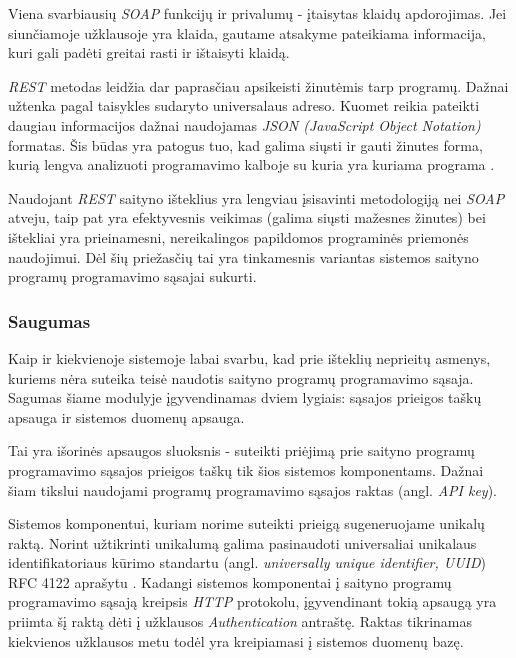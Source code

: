 \documentclass{VUMIFPSkursinis}
\begin{document}
Viena svarbiausių \textit{SOAP} funkcijų ir privalumų - įtaisytas klaidų apdorojimas. Jei siunčiamoje užklausoje yra klaida, gautame atsakyme pateikiama informacija, kuri gali padėti greitai rasti ir ištaisyti klaidą.


\textit{REST} metodas leidžia dar paprasčiau apsikeisti žinutėmis tarp programų. Dažnai užtenka pagal taisykles sudaryto universalaus adreso. Kuomet reikia pateikti daugiau informacijos dažnai naudojamas \textit{JSON (JavaScript Object Notation)} formatas. Šis būdas yra patogus tuo, kad galima siųsti ir gauti žinutes forma, kurią lengva analizuoti programavimo kalboje su kuria yra kuriama programa \cite{SoapRest}.

Naudojant \textit{REST} saityno išteklius yra lengviau įsisavinti metodologiją nei \textit{SOAP} atveju, taip pat yra efektyvesnis veikimas (galima siųsti mažesnes žinutes) bei ištekliai yra prieinamesni, nereikalingos papildomos programinės priemonės naudojimui. Dėl šių priežasčių tai yra tinkamesnis variantas sistemos saityno programų programavimo sąsajai sukurti.

\subsubsection{Saugumas}

Kaip ir kiekvienoje sistemoje labai svarbu, kad prie išteklių neprieitų asmenys, kuriems nėra suteika teisė naudotis saityno programų programavimo sąsaja. Sagumas šiame modulyje įgyvendinamas dviem lygiais: sąsajos prieigos taškų apsauga ir sistemos duomenų apsauga.


Tai yra išorinės apsaugos sluoksnis - suteikti priėjimą prie saityno programų programavimo sąsajos prieigos taškų tik šios sistemos komponentams. Dažnai šiam tikslui naudojami programų programavimo sąsajos raktas (angl. \textit{API key}).

Sistemos komponentui, kuriam norime suteikti prieigą sugeneruojame unikalų raktą. Norint užtikrinti unikalumą galima pasinaudoti universaliai unikalaus identifikatoriaus kūrimo standartu (angl. \textit{universally unique identifier, UUID}) RFC 4122 aprašytu \cite{uuidRef}. Kadangi sistemos komponentai į saityno programų programavimo sąsają kreipsis \textit{HTTP} protokolu, įgyvendinant tokią apsaugą yra priimta šį raktą dėti į užklausos \textit{Authentication} antraštę. Raktas tikrinamas kiekvienos užklausos metu todėl yra kreipiamasi į sistemos duomenų bazę.
\end{document}
